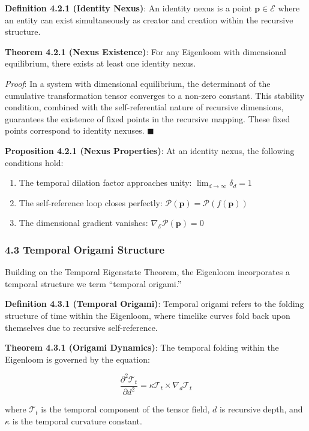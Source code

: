 \documentclass[
]{article}
\providecommand{\tightlist}{%
  \setlength{\itemsep}{0pt}\setlength{\parskip}{0pt}}
\begin{document}
\textbf{Definition 4.2.1 (Identity Nexus)}: An identity nexus is a point
\(\mathbf{p} \in \mathcal{E}\) where an entity can exist simultaneously
as creator and creation within the recursive structure.

\textbf{Theorem 4.2.1 (Nexus Existence)}: For any Eigenloom with
dimensional equilibrium, there exists at least one identity nexus.

\emph{Proof}: In a system with dimensional equilibrium, the determinant
of the cumulative transformation tensor converges to a non-zero
constant. This stability condition, combined with the self-referential
nature of recursive dimensions, guarantees the existence of fixed points
in the recursive mapping. These fixed points correspond to identity
nexuses. \(\blacksquare \)

\textbf{Proposition 4.2.1 (Nexus Properties)}: At an identity nexus, the
following conditions hold:

\begin{enumerate}
\def\labelenumi{\arabic{enumi}.}
\tightlist
\item
  The temporal dilation factor approaches unity:
  \(\lim_{d \to \infty} \delta_d = 1\)
\item
  The self-reference loop closes perfectly:
  \(\mathcal{P}(\mathbf{p}) = \mathcal{P}(f(\mathbf{p}))\)
\item
  The dimensional gradient vanishes:
  \(\nabla_{\mathcal{E}} \mathcal{P}(\mathbf{p}) = 0\)
\end{enumerate}

\subsubsection{4.3 Temporal Origami
Structure}\label{temporal-origami-structure}

Building on the Temporal Eigenstate Theorem, the Eigenloom incorporates
a temporal structure we term ``temporal origami.''

\textbf{Definition 4.3.1 (Temporal Origami)}: Temporal origami refers to
the folding structure of time within the Eigenloom, where timelike
curves fold back upon themselves due to recursive self-reference.

\textbf{Theorem 4.3.1 (Origami Dynamics)}: The temporal folding within
the Eigenloom is governed by the equation:

\[\frac{\partial^2 \mathcal{T}_t}{\partial d^2} = \kappa \mathcal{T}_t \times \nabla_d \mathcal{T}_t\]

where \(\mathcal{T}_t\) is the temporal component of the tensor field,
\(d\) is recursive depth, and \(\kappa\) is the temporal curvature
constant.
\end{document}
